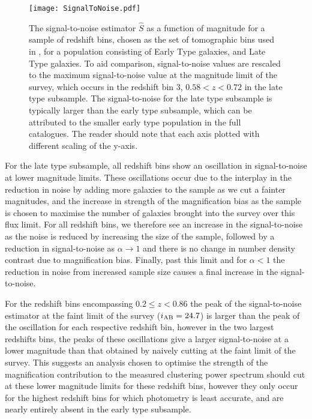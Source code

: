 \documentclass[useAMS,usenatbib,times,letter,amssymb]{mn2e}
\begin{document}
\begin{figure}
\centering
\texttt{[image: SignalToNoise.pdf]}
\caption{The signal-to-noise estimator $\hat{S}$ as a function of magnitude for a sample of redshift bins, chosen as the set of tomographic bins used in \citet{Heymans:2013p2015}, for a population consisting of Early Type galaxies, and Late Type galaxies. To aid comparison, signal-to-noise values are rescaled to the maximum signal-to-noise value at the magnitude limit of the survey, which occurs in the redshift bin $3$, $0.58<z<0.72$ in the late type subsample. The signal-to-noise for the late type subsample is typically larger than the early type subsample, which can be attributed to the smaller early type population in the full catalogues. The reader should note that each axis plotted with different scaling of the y-axis.}\label{Fig:SignalToNoise}
\end{figure}

For the late type subsample, all redshift bins show an oscillation in signal-to-noise at lower magnitude limits. These oscillations occur due to the interplay in the reduction in noise by adding more galaxies to the sample as we cut a fainter magnitudes, and the increase in strength of the magnification bias as the sample is chosen to maximise the number of galaxies brought into the survey over this flux limit. For all redshift bins, we therefore see an increase in the signal-to-noise as the noise is reduced by increasing the size of the sample, followed by a reduction in signal-to-noise as $\alpha\to 1$ and there is no change in number density contrast due to magnification bias. Finally, past this limit and for $\alpha < 1$ the reduction in noise from increased sample size causes a final increase in the signal-to-noise. 

For the redshift bins encompassing $0.2\le z<0.86$ the peak of the signal-to-noise estimator at the faint limit of the survey ($i_{\rm AB} = 24.7$) is larger than the peak of the oscillation for each respective redshift bin, however in the two largest redshifts bins, the peaks of these oscillations give a larger signal-to-noise at a lower magnitude than that obtained by naively cutting at the faint limit of the survey. This suggests an analysis chosen to optimise the strength of the magnification contribution to the measured clustering power spectrum should cut at these lower magnitude limits for these redshift bins, however they only occur for the highest redshift bins for which photometry is least accurate, and are nearly entirely absent in the early type subsample. 
\end{document}

